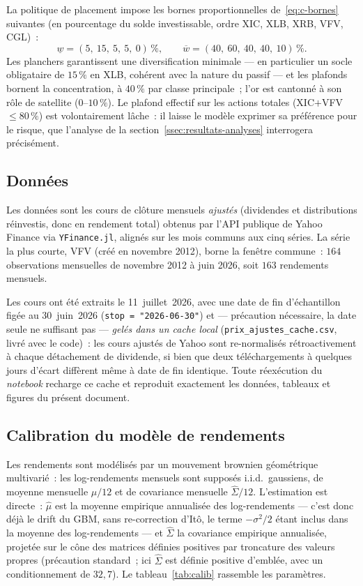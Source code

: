 \documentclass[11pt,letterpaper]{article}
\theoremstyle{definition}
\begin{document}
La politique de placement impose les bornes proportionnelles
de~\eqref{eq:c-bornes} suivantes (en pourcentage du solde investissable, ordre
XIC, XLB, XRB, VFV, CGL)~:
\[
\underline w = (5,\ 15,\ 5,\ 5,\ 0)\,\%,
\qquad
\overline w = (40,\ 60,\ 40,\ 40,\ 10)\,\%.
\]
Les planchers garantissent une diversification minimale --- en particulier un
socle obligataire de $15\,\%$ en XLB, cohérent avec la nature du passif --- et
les plafonds bornent la concentration, à $40\,\%$ par classe principale~; l'or
est cantonné à son rôle de satellite ($0$--$10\,\%$). Le plafond effectif sur
les actions totales (XIC$+$VFV $\le 80\,\%$) est volontairement lâche~: il
laisse le modèle exprimer sa préférence pour le risque, que l'analyse de la
section~\ref{ssec:resultats-analyses} interrogera précisément.

\subsection{Données}\label{ssec:donnees-brutes}

Les données sont les cours de clôture mensuels \emph{ajustés} (dividendes et
distributions réinvestis, donc en rendement total) obtenus par l'API publique
de Yahoo Finance via \texttt{YFinance.jl}, alignés sur les mois communs aux
cinq séries. La série la plus courte, VFV (créé en novembre 2012), borne la
fenêtre commune~: $164$ observations mensuelles de novembre 2012 à juin 2026,
soit $163$ rendements mensuels.

Les cours ont été extraits le 11~juillet~2026, avec une date de fin
d'échantillon figée au 30~juin~2026 (\texttt{stop = "2026-06-30"}) et ---
précaution nécessaire, la date seule ne suffisant pas --- \emph{gelés dans un
cache local} (\texttt{prix\_ajustes\_cache.csv}, livré avec le code)~: les
cours ajustés de Yahoo sont re-normalisés rétroactivement à chaque détachement
de dividende, si bien que deux téléchargements à quelques jours d'écart
diffèrent même à date de fin identique. Toute réexécution du \emph{notebook}
recharge ce cache et reproduit exactement les données, tableaux et figures du
présent document.

\subsection{Calibration du modèle de rendements}\label{ssec:calibration}

Les rendements sont modélisés par un mouvement brownien géométrique
multivarié~: les log-rendements mensuels sont supposés i.i.d.\ gaussiens, de
moyenne mensuelle $\hat\mu/12$ et de covariance mensuelle $\hat\Sigma/12$.
L'estimation est directe~: $\hat\mu$ est la moyenne empirique annualisée des log-rendements ---
c'est donc déjà le drift du GBM, sans re-correction d'Itô, le terme
$-\sigma^2/2$ étant inclus dans la moyenne des log-rendements --- et
$\hat\Sigma$ la covariance empirique annualisée, projetée sur le cône des
matrices définies positives par troncature des valeurs propres (précaution
standard~; ici $\hat\Sigma$ est définie positive d'emblée, avec un
conditionnement de $32{,}7$). Le tableau~\ref{tab:calib} rassemble les
paramètres.
\end{document}

